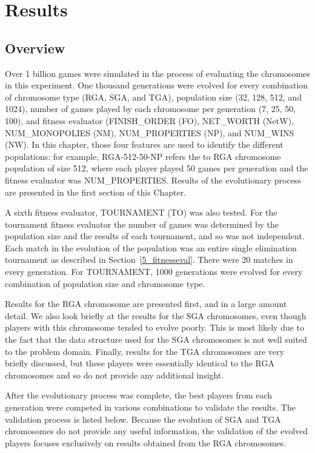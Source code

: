 \clearpage
\chapter{Results}\label{chap:results}

\section{Overview}

Over 1 billion games were simulated in the process of evaluating the chromosomes
in this experiment. One thousand generations were evolved for every combination
of chromosome type (RGA, SGA, and TGA), population size (32, 128, 512, and
1024), number of games played by each chromosome per generation (7, 25, 50,
100), and fitness evaluator (FINISH\_ORDER (FO), NET\_WORTH (NetW),
NUM\_MONOPOLIES (NM), NUM\_PROPERTIES (NP), and NUM\_WINS (NW). In this chapter,
those four features are used to identify the different populations: for example,
RGA-512-50-NP refers the to RGA chromosome population of size 512, where each
player played 50 games per generation and the fitness evaluator was
NUM\_PROPERTIES. Results of the evolutionary process are presented in the first
section of this Chapter.

A sixth fitness evaluator, TOURNAMENT (TO) was also tested. For the tournament
fitness evaluator the number of games was determined by the population size and
the results of each tournament, and so was not independent. Each match in the
evolution of the population was an entire single elimination tournament as
described in Section~\ref{5_fitnesseval}. There were 20 matches in every
generation. For TOURNAMENT, 1000 generations were evolved for every combination
of population size and chromosome type.

Results for the RGA chromosome are presented first, and in a large amount
detail. We also look briefly at the results for the SGA chromosomes, even though
players with this chromosome tended to evolve poorly. This is most likely due to
the fact that the data structure used for the SGA chromosomes is not well suited
to the problem domain. Finally, results for the TGA chromosomes are very briefly
discussed, but these players were essentially identical to the RGA chromosomes
and so do not provide any additional insight.

After the evolutionary process was complete, the best players from each
generation were competed in various combinations to validate the results. The
validation process is listed below. Because the evolution of SGA and TGA
chromosomes do not provide any useful information, the validation of the evolved
players focuses exclusively on results obtained from the RGA chromosomes.


